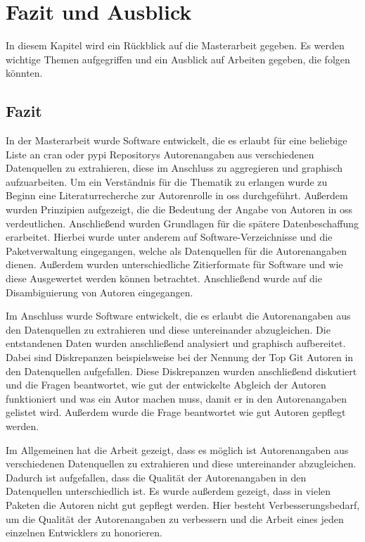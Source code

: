 \chapter{Fazit und Ausblick}
\label{cap:fazit_ausblick}
In diesem Kapitel wird ein Rückblick auf die Masterarbeit gegeben. Es werden wichtige Themen aufgegriffen und ein Ausblick auf Arbeiten gegeben, die folgen könnten.

\section{Fazit}
\label{sec:fazit}
In der Masterarbeit wurde Software entwickelt, die es erlaubt für eine beliebige Liste an \gls{cran} oder \gls{pypi} Repositorys Autorenangaben aus verschiedenen Datenquellen zu extrahieren, diese im Anschluss zu aggregieren und graphisch aufzuarbeiten.
Um ein Verständnis für die Thematik zu erlangen wurde zu Beginn eine Literaturrecherche zur Autorenrolle in \gls{oss} durchgeführt.
Außerdem wurden Prinzipien aufgezeigt, die die Bedeutung der Angabe von Autoren in \gls{oss} verdeutlichen.
Anschließend wurden Grundlagen für die spätere Datenbeschaffung erarbeitet.
Hierbei wurde unter anderem auf Software-Verzeichnisse und die Paketverwaltung eingegangen, welche als Datenquellen für die Autorenangaben dienen.
Außerdem wurden unterschiedliche Zitierformate für Software und wie diese Ausgewertet werden können betrachtet.
Anschließend wurde auf die Disambiguierung von Autoren eingegangen.

Im Anschluss wurde Software entwickelt, die es erlaubt die Autorenangaben aus den Datenquellen zu extrahieren und diese untereinander abzugleichen.
Die entstandenen Daten wurden anschließend analysiert und graphisch aufbereitet.
Dabei sind Diskrepanzen beispielsweise bei der Nennung der Top Git Autoren in den Datenquellen aufgefallen.
Diese Diskrepanzen wurden anschließend diskutiert und die Fragen beantwortet, wie gut der entwickelte Abgleich der Autoren funktioniert und was ein Autor machen muss, damit er in den Autorenangaben gelistet wird.
Außerdem wurde die Frage beantwortet wie gut Autoren gepflegt werden.

Im Allgemeinen hat die Arbeit gezeigt, dass es möglich ist Autorenangaben aus verschiedenen Datenquellen zu extrahieren und diese untereinander abzugleichen.
Dadurch ist aufgefallen, dass die Qualität der Autorenangaben in den Datenquellen unterschiedlich ist.
Es wurde außerdem gezeigt, dass in vielen Paketen die Autoren nicht gut gepflegt werden.
Hier besteht Verbesserungsbedarf, um die Qualität der Autorenangaben zu verbessern und die Arbeit eines jeden einzelnen Entwicklers zu honorieren.


